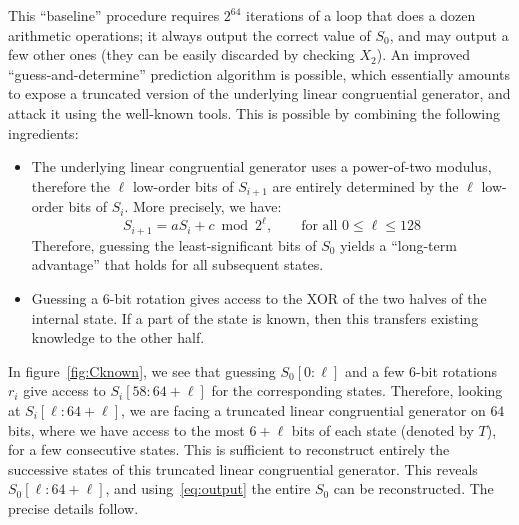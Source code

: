 \documentclass[submission,svgnames,journal=tosc]{iacrtrans}
\begin{document}
This ``baseline'' procedure requires $2^{64}$ iterations of a loop that does a
dozen arithmetic operations; it always output the correct value of $S_0$, and
may output a few other ones (they can be easily discarded by checking $X_2$). An
improved ``guess-and-determine'' prediction algorithm is possible, which
essentially amounts to expose a truncated version of the underlying linear
congruential generator, and attack it using the well-known tools. This is
possible by combining the following ingredients:
\begin{itemize}
\item The underlying linear congruential generator uses a power-of-two modulus,
  therefore the $\ell$ low-order bits of $S_{i+1}$ are entirely determined by
  the $\ell$ low-order bits of $S_i$. More precisely, we have:
  \begin{equation}\label{eq:lcg}
    S_{i+1} = aS_i + c \bmod 2^\ell, \qquad \text{for all } 0 \leq \ell \leq 128
  \end{equation}
  Therefore, guessing the least-significant bits of $S_0$ yields a ``long-term
  advantage'' that holds for all subsequent states.

\item Guessing a 6-bit rotation gives access to the XOR of the two halves of the
  internal state. If a part of the state is known, then this transfers existing
  knowledge to the other half.
\end{itemize}

In figure~\ref{fig:Cknown}, we see that guessing $S_0[0:\ell]$ and a few 6-bit
rotations $r_i$ give access to $S_i[58:64+\ell]$ for the corresponding
states. Therefore, looking at $S_i[\ell:64+\ell]$, we are facing a truncated
linear congruential generator on $64$ bits, where we have access to the most
$6+\ell$ bits of each state (denoted by $T$), for a few consecutive states. This
is sufficient to reconstruct entirely the successive states of this truncated
linear congruential generator. This reveals $S_0[\ell:64+\ell]$, and
using~\eqref{eq:output} the entire $S_0$ can be reconstructed. The precise
details follow.
\end{document}
